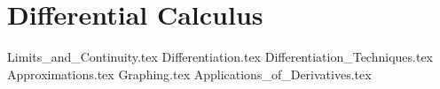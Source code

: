 \section{Differential Calculus}

{Limits_and_Continuity.tex}
{Differentiation.tex}
{Differentiation_Techniques.tex}
{Approximations.tex}
{Graphing.tex}
{Applications_of_Derivatives.tex}